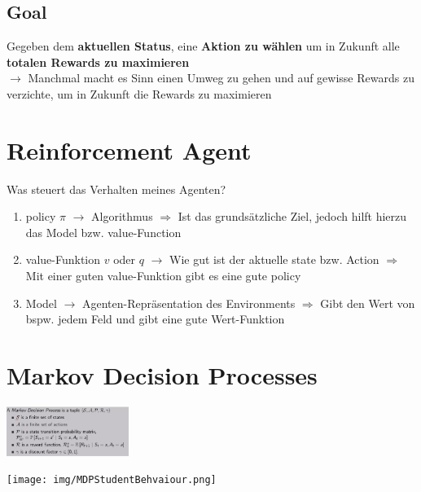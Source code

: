 \documentclass{article}
\newenvironment{Figure}
	{\par\medskip\noindent\minipage{\linewidth}}
	{\endminipage\par\medskip}
\theoremstyle{merke}
\theoremstyle{definition}
\begin{document}
	\subsection{Goal}
Gegeben dem \textbf{aktuellen Status}, eine \textbf{Aktion zu wählen} um in Zukunft alle \textbf{totalen Rewards zu maximieren} \\
$\rightarrow$ Manchmal macht es Sinn einen Umweg zu gehen und auf gewisse Rewards zu verzichte, um in Zukunft die Rewards zu maximieren

\section{Reinforcement Agent}
Was steuert das Verhalten meines Agenten?
\begin{enumerate}
	\item policy $\pi$ $\rightarrow$ Algorithmus $\Rightarrow$ Ist das grundsätzliche Ziel, jedoch hilft hierzu das Model bzw. value-Function
	\item value-Funktion $v$ oder $q$ $\rightarrow$ Wie gut ist der aktuelle state bzw. Action $\Rightarrow$ Mit einer guten value-Funktion gibt es eine gute policy
	\item Model $\rightarrow$ Agenten-Repräsentation des Environments $\Rightarrow$ Gibt den Wert von bspw. jedem Feld und gibt eine gute Wert-Funktion
\end{enumerate}

    \section{Markov Decision Processes}
    \begin{Figure}
    \centering
    \includegraphics[width=150px]{img/MDP.png}
        \label{fig:Abbildung zur Beschreibung zu Markov Decision Process}
    \end{Figure}
        
    \begin{Figure}
    \centering
    \texttt{[image: img/MDPStudentBehvaiour.png]}
        \label{fig:Abbildung zu einem beispielhaften MDP mit dem Verhalten von Studierenden}
    \end{Figure}
\end{document}
